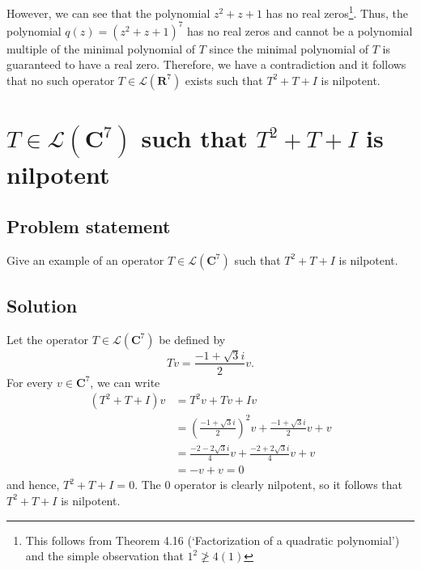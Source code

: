 \documentclass{article}
\begin{document}
However, we can see that the polynomial $z^2+z+1$ has no real zeros\footnote{This follows from Theorem 4.16 (`Factorization of a quadratic polynomial') and the simple observation that $1^2\ngeq 4(1)$}. Thus, the polynomial $q(z)=(z^2+z+1)^7$ has no real zeros and cannot be a polynomial multiple of the minimal polynomial of $T$ since the minimal polynomial of $T$ is guaranteed to have a real zero. Therefore, we have a contradiction and it follows that no such operator $T\in\mathcal{L}(\mathbf{R}^7)$ exists such that $T^2+T+I$ is nilpotent.

\clearpage

\section{$T\in\mathcal{L}(\mathbf{C}^7)$ such that $T^2+T+I$ is nilpotent}
\subsection*{Problem statement}
Give an example of an operator $T\in\mathcal{L}(\mathbf{C}^7)$ such that $T^2+T+I$ is nilpotent.

\subsection*{Solution}
Let the operator $T\in\mathcal{L}(\mathbf{C}^7)$ be defined by
\[Tv=\frac{-1+\sqrt{3}i}{2}v.\]
For every $v\in\mathbf{C}^7$, we can write
\begin{align*}
    (T^2+T+I)v&=T^2v+Tv+Iv\\
    &=(\frac{-1+\sqrt{3}i}{2})^2v+\frac{-1+\sqrt{3}i}{2}v+v\\
    &=\frac{-2-2\sqrt{3}i}{4}v+\frac{-2+2\sqrt{3}i}{4}v+v\\
    &=-v+v=0
\end{align*}
and hence, $T^2+T+I=0$. The $0$ operator is clearly nilpotent, so it follows that $T^2+T+I$ is nilpotent.
\end{document}
